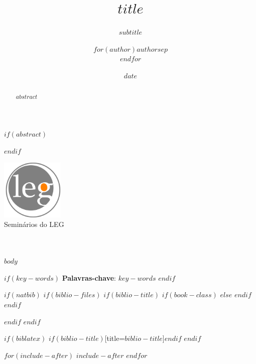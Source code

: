 \documentclass[a4paper, 11pt,]{article}
\title{$title$}
\title{}
\subtitle{$subtitle$}
\author{$for(author)$$author$$sep$ \\ $endfor$}
\author{}
\date{$date$}
\date{}
\begin{document}
\pagestyle{empty}

$if(abstract)$
  \begin{abstract}
$abstract$
  \end{abstract}
$endif$


\makeatletter
\begin{center}
  \includegraphics[width=3cm]{leg.pdf}\\
  \Large{Seminários do LEG}\\[10ex]
  {\huge \bfseries  \@title }\\[2ex]
  {\LARGE  \@author}\\[2ex]
  {\Large \@date}
\end{center}
\makeatother


$body$ %

\vspace{1ex}
$if(key-words)$
  \textbf{Palavras-chave}: $key-words$
$endif$

$if(natbib)$
  $if(biblio-files)$
    $if(biblio-title)$
      $if(book-class)$
        \renewcommand\bibname{$biblio-title$}
      $else$
        \renewcommand\refname{$biblio-title$}
      $endif$
    $endif$
      
  $endif$
$endif$

$if(biblatex)$
\printbibliography$if(biblio-title)$[title=$biblio-title$]$endif$
$endif$

$for(include-after)$
  $include-after$
$endfor$
\end{document}
